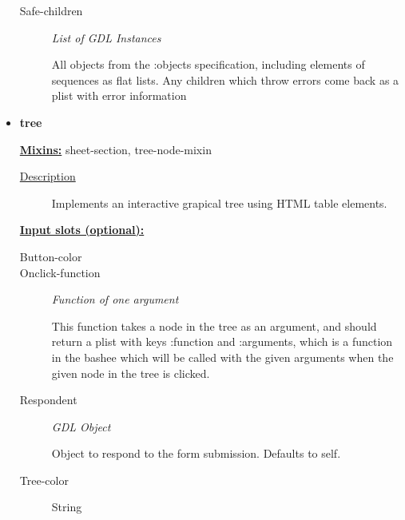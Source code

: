 \documentclass [11pt]{book}
\begin{document}
\begin{itemize}
\begin{description}
\item [Safe-children]
\emph{List of GDL Instances}

 All objects from the :objects specification, including elements of sequences
as flat lists. Any children which throw errors come back as a plist with error information




\end{description}







\item {}
\label{prim:tree}
\textbf{tree}


\textbf{
\underline{Mixins:}} sheet-section, tree-node-mixin





\begin{description}

\item [
\underline{Description}]


Implements an interactive grapical tree using HTML table elements.



\end{description}








\textbf{
\underline{Input slots (optional):}}

\begin{description}

\item [Button-color]





\item [Onclick-function]
\emph{Function of one argument}

 This function takes a node in the tree as an argument, and should return
a plist with keys :function and :arguments, which is a function in the bashee which will be called
with the given arguments when the given node in the tree is clicked.




\item [Respondent]
\emph{GDL Object}

 Object to respond to the form submission. Defaults to self.




\item [Tree-color]

String




\end{description}







\end{itemize}
\end{document}
